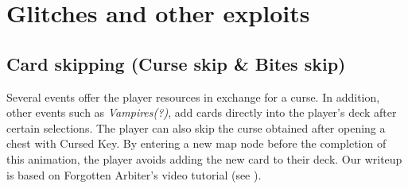 \documentclass[12pt]{amsart}
\begin{document}
\section{Glitches and other exploits}\label{sec: glitches and exploits}
\subsection{Card skipping (Curse skip \& Bites skip)}\label{sub-sec: card skips}
Several events offer the player resources in exchange for a curse.  
In addition, other events such as  \textit{Vampires(?)}, add cards directly into the player's deck after certain selections.  
The player can also skip the curse obtained after opening a chest with Cursed Key.  
By entering a new map node before the completion of this animation, the player avoids adding the new card to their deck.  
Our writeup is based on Forgotten Arbiter's video tutorial (see \cite{ForgottenArbiterMoreGlitches}).  
\\
\end{document}
